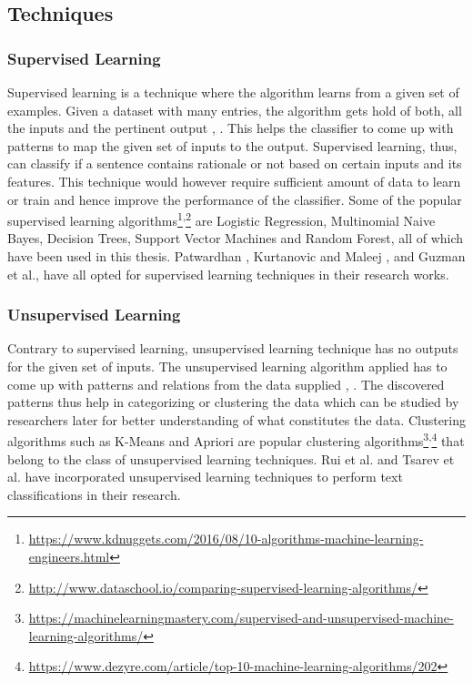 \documentclass[a4paper,12pt,twoside]{report}
\begin{document}
\subsection{Techniques}

\subsubsection{Supervised Learning}
Supervised learning is a technique where the algorithm learns from a given set of examples. Given a dataset with many entries, the algorithm gets hold of both, all the inputs and the pertinent output \cite{Singh2016}, \cite{Caruana2006}. This helps the classifier to come up with patterns to map the given set of inputs to the output. Supervised learning, thus, can classify if a sentence contains rationale or not based on certain inputs and its features. This technique would however require sufficient amount of data to learn or train and hence improve the performance of the classifier. Some of the popular supervised learning algorithms\footnote{\url{https://www.kdnuggets.com/2016/08/10-algorithms-machine-learning-engineers.html}}\textsuperscript{,}\footnote{\url{http://www.dataschool.io/comparing-supervised-learning-algorithms/}} are Logistic Regression, Multinomial Naive Bayes, Decision Trees, Support Vector Machines and Random Forest, all of which have been used in this thesis. Patwardhan \cite{Patwardhan2017}, Kurtanovic and Maleej \cite{Kurtanovic2017}, and Guzman et al.\cite{Guzman2016}, have all opted for supervised learning techniques in their research works.

\subsubsection{Unsupervised Learning}  
Contrary to supervised learning, unsupervised learning technique has no outputs for the given set of inputs. The unsupervised learning algorithm applied has to come up with patterns and relations from the data supplied \cite{Ball2011}, \cite{Rojas1996}. The discovered patterns thus help in categorizing or clustering the data which can be studied by researchers later for better understanding of what constitutes the data. Clustering algorithms such as K-Means and Apriori are popular clustering algorithms\footnote{\url{https://machinelearningmastery.com/supervised-and-unsupervised-machine-learning-algorithms/}}\textsuperscript{,}\footnote{\url{https://www.dezyre.com/article/top-10-machine-learning-algorithms/202}} that belong to the class of unsupervised learning techniques. Rui et al.\cite{Rui2016} and Tsarev et al. \cite{Tsarev2011} have incorporated unsupervised learning techniques to perform text classifications in their research. 
\end{document}
